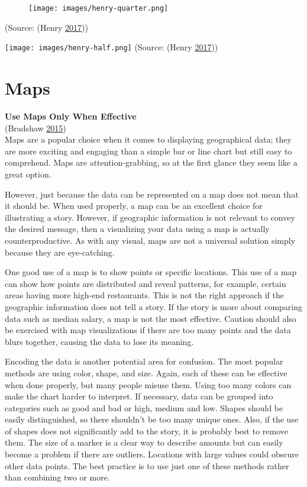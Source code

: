 \documentclass[]{book}
\begin{document}
\begin{figure}
\centering
\texttt{[image: images/henry-quarter.png]}
\caption{}
\end{figure}

(Source: (Henry \protect\hyperlink{ref-henry-defense-pie}{2017}))

\texttt{[image: images/henry-half.png]} (Source: (Henry
\protect\hyperlink{ref-henry-defense-pie}{2017}))

\section{Maps}\label{maps}

\textbf{Use Maps Only When Effective}\\
(Bradshaw \protect\hyperlink{ref-Bradshaw}{2015})\\
Maps are a popular choice when it comes to displaying geographical data;
they are more exciting and engaging than a simple bar or line chart but
still easy to comprehend. Maps are attention-grabbing, so at the first
glance they seem like a great option.

However, just because the data can be represented on a map does not mean
that it should be. When used properly, a map can be an excellent choice
for illustrating a story. However, if geographic information is not
relevant to convey the desired message, then a visualizing your data
using a map is actually counterproductive. As with any visual, maps are
not a universal solution simply because they are eye-catching.

One good use of a map is to show points or specific locations. This use
of a map can show how points are distributed and reveal patterns, for
example, certain areas having more high-end restaurants. This is not the
right approach if the geographic information does not tell a story. If
the story is more about comparing data such as median salary, a map is
not the most effective. Caution should also be exercised with map
visualizations if there are too many points and the data blurs together,
causing the data to lose its meaning.

Encoding the data is another potential area for confusion. The most
popular methods are using color, shape, and size. Again, each of these
can be effective when done properly, but many people misuse them. Using
too many colors can make the chart harder to interpret. If necessary,
data can be grouped into categories such as good and bad or high, medium
and low. Shapes should be easily distinguished, so there shouldn't be
too many unique ones. Also, if the use of shapes does not significantly
add to the story, it is probably best to remove them. The size of a
marker is a clear way to describe amounts but can easily become a
problem if there are outliers. Locations with large values could obscure
other data points. The best practice is to use just one of these methods
rather than combining two or more.
\end{document}
